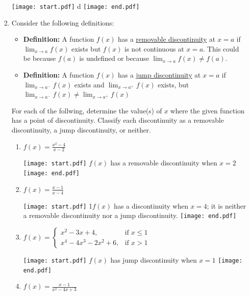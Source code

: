 \documentclass[12pt]{article}
\begin{document}
\begin{enumerate}
\texttt{[image: start.pdf]}
{{d}}
\texttt{[image: end.pdf]}


\item Consider the following definitions:

\begin{itemize}

\item {\bf Definition:} A function $f(x)$ has a \underline{removable discontinuity} at $x=a$ if $\displaystyle \lim_{x\rightarrow a}{f(x)}$ exists but $f(x)$ is not continuous at $x=a$.  This could be because $f(a)$ is undefined or because $\displaystyle \lim_{x\rightarrow a}{f(x)} \neq f(a)$.

\item {\bf Definition:} A function $f(x)$ has a \underline{jump discontinuity} at $x=a$ if $\displaystyle \lim_{x \rightarrow a^-}{f(x)}$ exists and $\displaystyle \lim_{x \rightarrow a^+}{f(x)}$ exists, but $\displaystyle \lim_{x \rightarrow a^-}{f(x)}\neq \lim_{x \rightarrow a^+}{f(x)}$

\end{itemize}

For each of the follwing, determine the value(s) of $x$ where the given function has a point of discontinuity.  Classify each discontinuity as a removable discontinuity, a jump discontinuity, or neither.

\begin{enumerate}

\item $f(x)=\frac{x^2-4}{x-2}$

\texttt{[image: start.pdf]}
{{$f(x)$ has a removable discontinuity when $x=2$}}
\texttt{[image: end.pdf]}


\item $f(x)=\frac{x-1}{x-4}$

\texttt{[image: start.pdf]}
{{{1\linewidth}{$f(x)$ has a discontinuity when $x=4$; it is neither a removable discontinuity nor a jump discontinuity.}}}
\texttt{[image: end.pdf]}


\item $f(x) = \begin{cases} 
x^2-3x+4, & \text{if } x\leq1 \\
x^4-4x^3-2x^2+6, & \text{if } x>1 \end{cases}$ 

\texttt{[image: start.pdf]}
{{$f(x)$ has jump discontinuity when $x=1$}}
\texttt{[image: end.pdf]}


\item $f(x)=\frac{x-1}{x^2-4x+3}$


\end{enumerate}
\end{enumerate}
\end{document}
